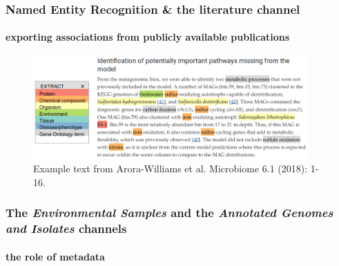 \documentclass{beamer}
\begin{document}
   \begin{frame}
      \frametitle{Named Entity Recognition \& the literature channel}
      \framesubtitle{exporting associations from publicly available publications}
      \begin{figure}
         \includegraphics[width=105mm]{resources/extract_example_transp.png}
         \caption{
            \scriptsize Example text from Arora-Williams et al. Microbiome 6.1 (2018): 1-16.
         }
      \end{figure}
      
   \end{frame}

   \begin{frame}

      \frametitle{The \textit{Environmental Samples} and the \textit{Annotated Genomes and Isolates} channels}
      \framesubtitle{the role of metadata}
   \end{frame}
\end{document}
